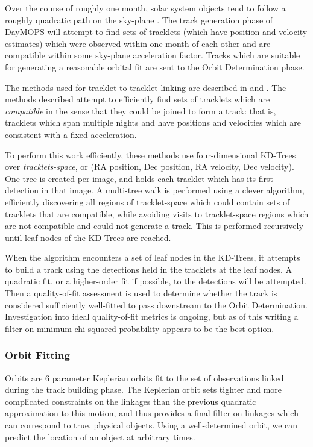 \documentclass[12pt,preprint]{aastex}
\begin{document}
Over the course of roughly one month, solar system objects tend to
follow a roughly quadratic path on the sky-plane
\citep{kubica_thesis}.  The track generation phase of DayMOPS will
attempt to find sets of tracklets (which have position and velocity
estimates) which were observed within one month of each other and are
compatible within some sky-plane acceleration factor.  Tracks which
are suitable for generating a reasonable orbital fit are sent to the
Orbit Determination phase. 

The methods used for tracklet-to-tracklet linking are described in
\citet{kubica_thesis} and \citet{Kubica:2005:MTA:1081870.1081889}.
The methods described attempt to efficiently find sets of tracklets
which are \textit{compatible} in the sense that they could be joined
to form a track: that is, tracklets which span multiple nights and
have positions and velocities which are consistent with a fixed
acceleration.  

To perform this work efficiently, these methods use four-dimensional
KD-Trees over \textit{tracklets-space}, or (RA position, Dec position,
RA velocity, Dec velocity). One tree is created per image, and holds
each tracklet which has its first detection in that image.  A
multi-tree walk is performed using a clever algorithm, efficiently
discovering all regions of tracklet-space which could contain sets of
tracklets that are compatible, while avoiding visits to tracklet-space
regions which are not compatible and could not generate a track.  This
is performed recursively until leaf nodes of the KD-Trees are reached.


When the algorithm encounters a set of leaf nodes in the KD-Trees, it
attempts to build a track using the detections held in the tracklets
at the leaf nodes.  A quadratic fit, or a higher-order fit if
possible, to the detections will be attempted.  Then a quality-of-fit
assessment is used to determine whether the track is considered
sufficiently well-fitted to pass downstream to the Orbit
Determination.  Investigation into ideal quality-of-fit metrics is
ongoing, but as of this writing a filter on minimum chi-squared
probability appears to be the best option.


\subsubsection{Orbit Fitting}
\label{orbitFitting}

Orbits are 6 parameter Keplerian orbits fit to the set of observations
linked during the track building phase. The Keplerian orbit sets
tighter and more complicated constraints on the linkages than the
previous quadratic approximation to this motion, and thus provides a
final filter on linkages which can correspond to true, physical
objects. Using a well-determined orbit, we can predict the location of
an object at arbitrary times.
\end{document}
